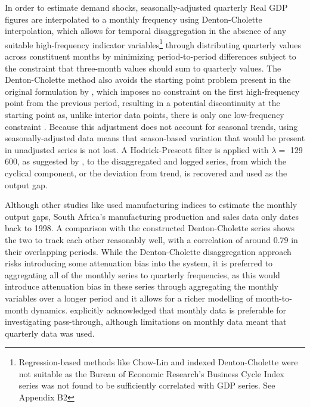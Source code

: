 \documentclass[12pt]{article}
\begin{document}
In order to estimate demand shocks, seasonally-adjusted quarterly Real GDP figures are interpolated to a monthly frequency using Denton-Cholette interpolation, which allows for temporal disaggregation in the absence of any suitable high-frequency indicator variables\footnote{Regression-based methods like Chow-Lin and indexed Denton-Cholette were not suitable as the Bureau of Economic Research's Business Cycle Index series was not found to be sufficiently correlated with GDP series. See Appendix B2} through distributing quarterly values across constituent months by minimizing period-to-period differences subject to the constraint that three-month values should sum to quarterly values. The Denton-Cholette method also avoids the starting point problem present in the original formulation by \textcite{denton1971}, which imposes no constraint on the first high-frequency point from the previous period, resulting in a potential discontinuity at the starting point as, unlike interior data points, there is only one low-frequency constraint \cite{DagumCholette2006}. Because this adjustment does not account for seasonal trends, using seasonally-adjusted data means that season-based variation that would be present in unadjusted series is not lost. A Hodrick-Prescott filter is applied with $\lambda = $ 129 600, as suggested by \textcite{ravn2002adjusting}, to the disaggregated and logged series, from which the cyclical component, or the deviation from trend, is recovered and used as the output gap.

 Although other studies like \textcite{AnWang2011} used manufacturing indices to estimate the monthly output gaps, South Africa's manufacturing production and sales data only dates back to 1998. A comparison with the constructed Denton-Cholette series shows the two to track each other reasonably well, with a correlation of around 0.79 in their overlapping periods. While the Denton-Cholette disaggregation approach risks introducing some attenuation bias into the system, it is preferred to aggregating all of the monthly series to quarterly frequencies, as this would introduce attenuation bias in these series through aggregating the monthly variables over a longer period and it allows for a richer modelling of month-to-month dynamics. \textcite{mccarthy1999} explicitly acknowledged that monthly data is preferable for investigating pass-through, although limitations on monthly data meant that quarterly data was used.
\end{document}
